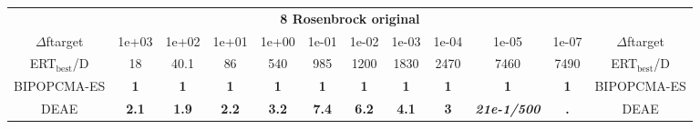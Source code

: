 \begin{tabular}{cccccccccccc}
 & \multicolumn{10}{c}{{\normalsize \textbf{8 Rosenbrock original}}}\\
$\Delta$ftarget& 1e+03& 1e+02& 1e+01& 1e+00& 1e-01& 1e-02& 1e-03& 1e-04& 1e-05& 1e-07 & $\Delta$ftarget \\
ERT$_{\textrm{best}}$/D& 18& 40.1& 86& 540& 985& 1200& 1830& 2470& 7460& 7490 & ERT$_{\textrm{best}}$/D \\
\hline
BIPOPCMA-ES & \textbf{1} & \textbf{1} & \textbf{1} & \textbf{1} & \textbf{1} & \textbf{1} & \textbf{1} & \textbf{1} & \textbf{1} & \textbf{1} & BIPOPCMA-ES \cite{add_an_entry_for_BIPOPCMA-ES_in_bbob.bib}\\
DEAE & \textbf{2.1} & \textbf{1.9} & \textbf{2.2} & \textbf{3.2} & \textbf{7.4} & \textbf{6.2} & \textbf{4.1} & \textbf{3} & \textbf{\textit{21e-1}\textit{/500}} & \textbf{.} & DEAE \cite{add_an_entry_for_DEAE_in_bbob.bib}
\end{tabular}

